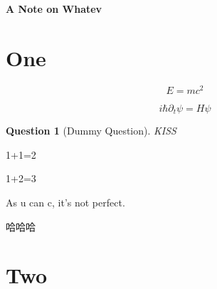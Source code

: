 \documentclass[a4paper,UTF8]{ctexart}
\newtheorem{question}{Question}
\begin{document}
\begin{center}
    \textbf{\Large A Note on Whatev}
    \par {}
\end{center}

{}
\setcounter{page}{1}
\tableofcontents

\setcounter{page}{1}

\section{One}

\begin{definition}
    \begin{equation}
        E = mc^2
    \end{equation}
\end{definition}

\begin{remark}[My remark]
    \begin{equation}
        i \hbar \partial_{t} \psi = H \psi
    \end{equation}
\end{remark}

\begin{question}[Dummy Question]
    KISS
\end{question}

\begin{review}
    1+1=2
\end{review}

\begin{lemma}[Nope]
    1+2=3
\end{lemma}

As u can c, it's not perfect.

哈哈哈


\section{Two}

%
\end{document}
